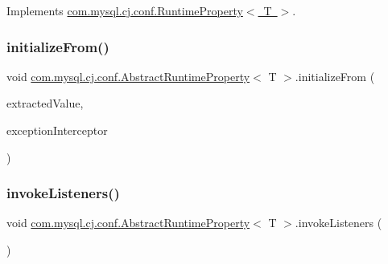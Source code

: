 Implements \mbox{\hyperlink{interfacecom_1_1mysql_1_1cj_1_1conf_1_1_runtime_property_a082d6bf96ac4865da37f76b4315a2262}{com.\+mysql.\+cj.\+conf.\+Runtime\+Property$<$ T $>$}}.

\mbox{\label{classcom_1_1mysql_1_1cj_1_1conf_1_1_abstract_runtime_property_a6df5f05e9054868bc4cca590b49f1295}} 
\subsubsection{\texorpdfstring{initialize\+From()}{initializeFrom()}\hspace{0.1cm}{\footnotesize\ttfamily [3/3]}}
{\footnotesize\ttfamily void \mbox{\hyperlink{classcom_1_1mysql_1_1cj_1_1conf_1_1_abstract_runtime_property}{com.\+mysql.\+cj.\+conf.\+Abstract\+Runtime\+Property}}$<$ T $>$.initialize\+From (\begin{DoxyParamCaption}\item[{String}]{extracted\+Value,  }\item[{\mbox{\hyperlink{interfacecom_1_1mysql_1_1cj_1_1exceptions_1_1_exception_interceptor}{Exception\+Interceptor}}}]{exception\+Interceptor }\end{DoxyParamCaption})\hspace{0.3cm}{\ttfamily [protected]}}

\mbox{\label{classcom_1_1mysql_1_1cj_1_1conf_1_1_abstract_runtime_property_a52fb1662461037f71b84d92b2286df8f}} 
\subsubsection{\texorpdfstring{invoke\+Listeners()}{invokeListeners()}}
{\footnotesize\ttfamily void \mbox{\hyperlink{classcom_1_1mysql_1_1cj_1_1conf_1_1_abstract_runtime_property}{com.\+mysql.\+cj.\+conf.\+Abstract\+Runtime\+Property}}$<$ T $>$.invoke\+Listeners (\begin{DoxyParamCaption}{ }\end{DoxyParamCaption})\hspace{0.3cm}{\ttfamily [protected]}}

